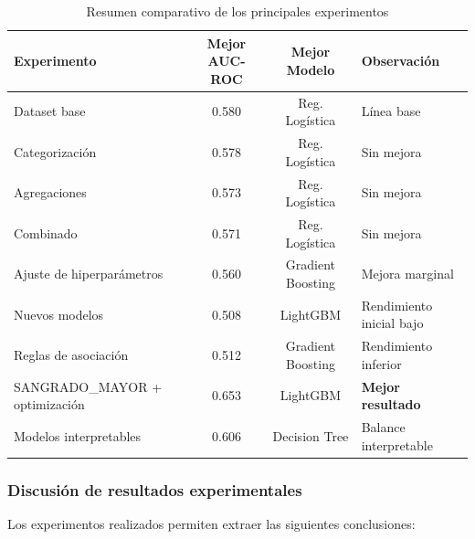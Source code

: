 \documentclass[12pt, letterpaper]{article}
\begin{document}
\begin{table}[H]
\centering
\caption{Resumen comparativo de los principales experimentos}
\label{tab:summary-experiments}
\small
\begin{tabular}{|p{4.5cm}|c|c|p{4cm}|}
\hline
\textbf{Experimento} & \textbf{Mejor AUC-ROC} & \textbf{Mejor Modelo} & \textbf{Observación} \\ \hline
Dataset base & 0.580 & Reg. Logística & Línea base \\ \hline
Categorización & 0.578 & Reg. Logística & Sin mejora \\ \hline
Agregaciones & 0.573 & Reg. Logística & Sin mejora \\ \hline
Combinado & 0.571 & Reg. Logística & Sin mejora \\ \hline
Ajuste de hiperparámetros & 0.560 & Gradient Boosting & Mejora marginal \\ \hline
Nuevos modelos & 0.508 & LightGBM & Rendimiento inicial bajo \\ \hline
Reglas de asociación & 0.512 & Gradient Boosting & Rendimiento inferior \\ \hline
SANGRADO\_MAYOR + optimización & 0.653 & LightGBM & \textbf{Mejor resultado} \\ \hline
Modelos interpretables & 0.606 & Decision Tree & Balance interpretable \\ \hline
\end{tabular}
\end{table}

\subsubsection{Discusión de resultados experimentales}

Los experimentos realizados permiten extraer las siguientes conclusiones:
\end{document}
